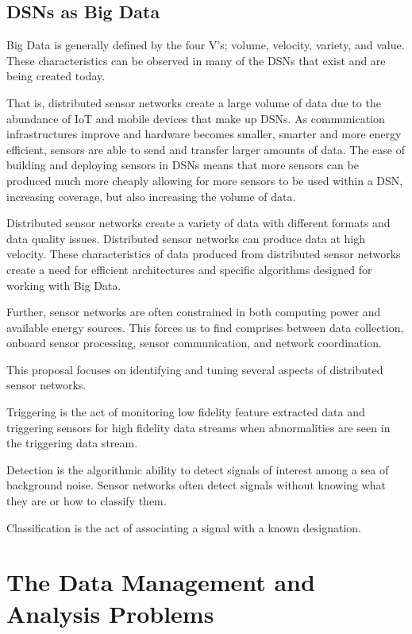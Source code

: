 \subsection{DSNs as Big Data}
Big Data is generally defined by the four V's; volume, velocity, variety, and value. These characteristics can be observed in many of the DSNs that exist and are being created today. %

That is, distributed sensor networks create a large volume of data due to the abundance of IoT and mobile devices that make up DSNs. As communication infrastructures improve and hardware becomes smaller, smarter and more energy efficient, sensors are able to send and transfer larger amounts of data. The ease of building and deploying sensors in DSNs means that more sensors can be produced much more cheaply allowing for more sensors to be used within a DSN, increasing coverage, but also increasing the volume of data.

Distributed sensor networks create a variety of data with different formats and data quality issues. Distributed sensor networks can produce data at high velocity. These characteristics of data produced from distributed sensor networks create a need for efficient architectures and specific algorithms designed for working with Big Data.

Further, sensor networks are often constrained in both computing power and available energy sources. This forces us to find comprises between data collection, onboard sensor processing, sensor communication, and network coordination.

This proposal focuses on identifying and tuning several aspects of distributed sensor networks.

Triggering is the act of monitoring low fidelity feature extracted data and triggering sensors for high fidelity data streams when abnormalities are seen in the triggering data stream.

Detection is the algorithmic ability to detect signals of interest among a sea of background noise. Sensor networks often detect signals without knowing what they are or how to classify them.

Classification is the act of associating a signal with a known designation.

\section{The Data Management and Analysis Problems}

